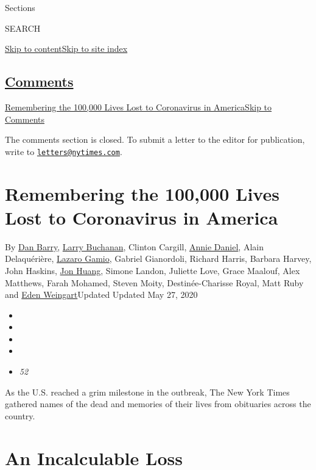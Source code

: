 Sections

SEARCH

\protect\hyperlink{site-content}{Skip to
content}\protect\hyperlink{site-index}{Skip to site index}

\hypertarget{comments}{%
\subsection{\texorpdfstring{\protect\hyperlink{commentsContainer}{Comments}}{Comments}}\label{comments}}

\href{}{Remembering the 100,000 Lives Lost to Coronavirus in
America}\href{}{Skip to Comments}

The comments section is closed. To submit a letter to the editor for
publication, write to
\href{mailto:letters@nytimes.com}{\nolinkurl{letters@nytimes.com}}.

\hypertarget{remembering-the-100000-lives-lost-to-coronavirus-in-america}{%
\section{Remembering the 100,000 Lives Lost to Coronavirus in
America}\label{remembering-the-100000-lives-lost-to-coronavirus-in-america}}

By \href{https://www.nytimes.com/by/dan-barry}{Dan Barry},
\href{https://www.nytimes.com/by/larry-buchanan}{Larry Buchanan},
Clinton Cargill, \href{https://www.nytimes.com/by/annie-daniel}{Annie
Daniel}, Alain Delaquérière,
\href{https://www.nytimes.com/by/lazaro-gamio}{Lazaro Gamio}, Gabriel
Gianordoli, Richard Harris, Barbara Harvey, John Haskins,
\href{https://www.nytimes.com/by/jon-huang}{Jon Huang}, Simone Landon,
Juliette Love, Grace Maalouf, Alex Matthews, Farah Mohamed, Steven
Moity, Destinée-Charisse Royal, Matt Ruby and
\href{https://www.nytimes.com/by/eden-weingart}{Eden Weingart}Updated
Updated May 27, 2020

\begin{itemize}
\item
\item
\item
\item
\item
  \emph{52}
\end{itemize}

As the U.S. reached a grim milestone in the outbreak, The New York Times
gathered names of the dead and memories of their lives from obituaries
across the country.

\hypertarget{an-incalculable-loss}{%
\section{An Incalculable Loss}\label{an-incalculable-loss}}

